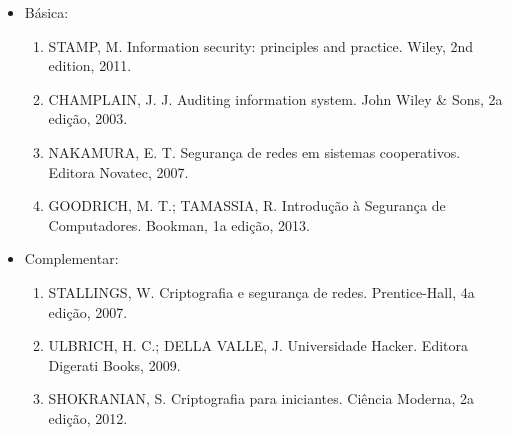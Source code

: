 \begin{itemize}

\item Básica:
    \begin{enumerate}

    \item STAMP, M.
          Information security: principles and practice.
          Wiley, 2nd edition, 2011.

    \item CHAMPLAIN, J. J.
          Auditing information system.
          John Wiley \& Sons, 2a edição, 2003.

    \item NAKAMURA, E. T.
          Segurança de redes em sistemas cooperativos.
          Editora Novatec, 2007.

    \item GOODRICH, M. T.; TAMASSIA, R.
          Introdução à Segurança de Computadores.
          Bookman, 1a edição, 2013.

    \end{enumerate}

\item Complementar:
    \begin{enumerate}

    \item STALLINGS, W.
          Criptografia e segurança de redes.
          Prentice-Hall, 4a edição, 2007.

    \item ULBRICH, H. C.; DELLA VALLE, J.
          Universidade Hacker.
          Editora Digerati Books, 2009.

    \item SHOKRANIAN, S.
          Criptografia para iniciantes.
          Ciência Moderna, 2a edição, 2012.

    \end{enumerate}

\end{itemize}
